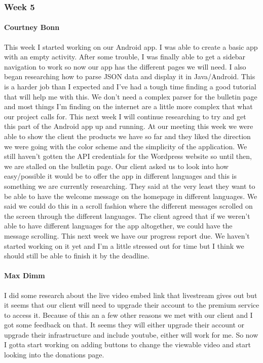 		\subsubsection{Week 5}

			\paragraph{Courtney Bonn}
			This week I started working on our Android app. I was able to create a basic app with an empty activity. After some trouble, I was finally able to get a sidebar navigation to work so now our app has the different pages we will need. I also began researching how to parse JSON data and display it in Java/Android. This is a harder job than I expected and I've had a tough time finding a good tutorial that will help me with this. We don't need a complex parser for the bulletin page and most things I'm finding on the internet are a little more complex that what our project calls for. This next week I will continue researching to try and get this part of the Android app up and running. At our meeting this week we were able to show the client the products we have so far and they liked the direction we were going with the color scheme and the simplicity of the application. We still haven't gotten the API credentials for the Wordpress website so until then, we are stalled on the bulletin page. Our client asked us to look into how easy/possible it would be to offer the app in different languages and this is something we are currently researching. They said at the very least they want to be able to have the welcome message on the homepage in different languages. We said we could do this in a scroll fashion where the different messages scrolled on the screen through the different languages. The client agreed that if we weren't able to have different languages for the app altogether, we could have the message scrolling. This next week we have our progress report due. We haven't started working on it yet and I'm a little stressed out for time but I think we should still be able to finish it by the deadline.

			\paragraph{Max Dimm}
			I did some research about the live video embed link that livestream gives out but it seems that our client will need to upgrade their account to the premium service to access it. Because of this an a few other reasons we met with our client and I got some feedback on that. It seems they will either upgrade their account or upgrade their infrastructure and include youtube, either will work for me. So now I gotta start working on adding buttons to change the viewable video and start looking into the donations page.

